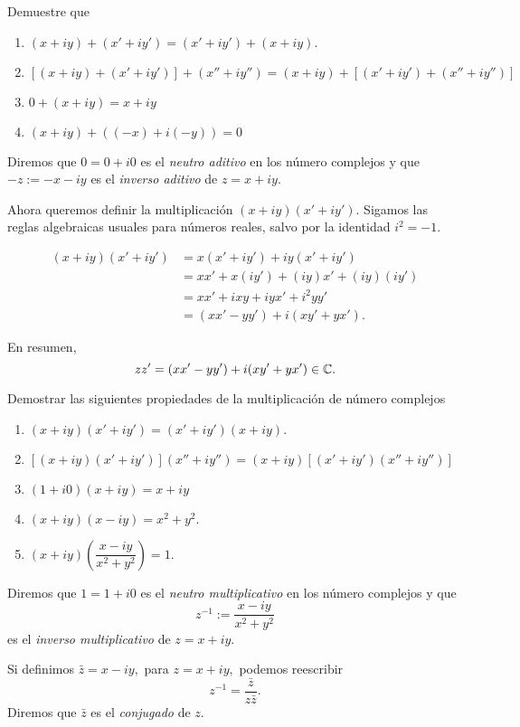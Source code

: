 \begin{problema}
Demuestre que 
\begin{enumerate}
 \item $(x+iy)+(x'+iy')=(x'+iy')+(x+iy).$
 \item $\left[ (x+iy)+(x'+iy') \right] +(x''+iy'')= (x+iy)+\left[ (x'+iy') +(x''+iy'') \right]$
 \item $0+(x+iy)=x+iy$
 \item $(x+iy)+((-x)+i(-y))=0$
\end{enumerate}\end{problema}

Diremos que $0=0+i0$ es el \emph{neutro aditivo} en los número complejos y que $-z:=-x-iy$ es el \emph{inverso aditivo}
de $z=x+iy.$

Ahora queremos definir la multiplicación $(x+iy)(x'+iy').$ Sigamos las reglas algebraicas usuales para números reales,
salvo por la identidad $i^2=-1.$

\begin{align*}
(x+iy)(x'+iy')&= x(x'+iy')+iy(x'+iy')\\
&= xx'+x(iy')+(iy)x'+(iy)(iy') \\
&= xx' + ixy +iyx' + i^{2}yy' \\
&= (xx'-yy')+i(xy'+yx').
\end{align*}

En resumen,
 $$
zz'= (xx'-yy')+i(xy'+yx') \in \mathbb{C}.
 $$

\begin{problema}
Demostrar las siguientes propiedades de la multiplicación de número complejos
\begin{enumerate}
 \item $(x+iy)(x'+iy')=(x'+iy')(x+iy).$
 \item $\left[ (x+iy)(x'+iy') \right] (x''+iy'')= (x+iy)\left[ (x'+iy') (x''+iy'') \right]$
 \item $(1+i0)(x+iy)=x+iy$
 \item $(x+iy)(x-iy)=x^2+y^2.$
 \item $(x+iy)\left( \dfrac{x-iy}{x^2+y^2} \right)=1.$
\end{enumerate}
\end{problema}

Diremos que $1=1+i0$ es el \emph{neutro multiplicativo} en los número complejos y que $$
z^{-1}:=\dfrac{x-iy}{x^2+y^2} 
$$ es el \emph{inverso multiplicativo} de $z=x+iy.$

Si definimos $\bar{z}=x-iy,$ para $z=x+iy,$ podemos reescribir $$z^{-1}=\dfrac{\bar{z}}{z\bar{z}}.$$
Diremos que $\bar{z}$ es el \emph{conjugado} de $z.$

